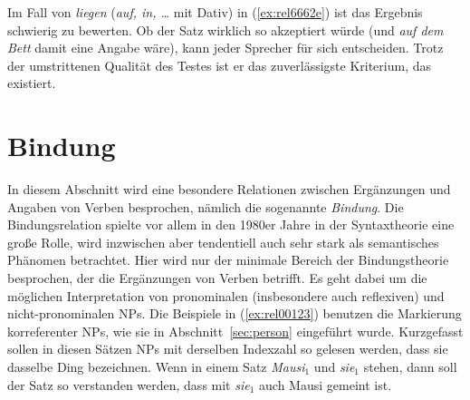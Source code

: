 \begin{exe}
  \ex\label{ex:rel6662}
  \begin{xlist}
  \end{xlist}
\end{exe}

Im Fall von \textit{liegen} (\textit{auf, in, \ldots} mit Dativ) in (\ref{ex:rel6662e}) ist das Ergebnis schwierig zu bewerten.
Ob der Satz wirklich so akzeptiert würde (und \textit{auf dem Bett} damit eine Angabe wäre), kann jeder Sprecher für sich entscheiden.
Trotz der umstrittenen Qualität des Testes ist er das zuverlässigste Kriterium, das existiert.

\Stretch[0.5]


\section{Bindung}

\label{sec:bindung}

In diesem Abschnitt wird eine besondere Relationen zwischen Ergänzungen und Angaben von Verben besprochen, nämlich die sogenannte \textit{Bindung}.
Die Bindungsrelation spielte vor allem in den 1980er Jahre in der Syntaxtheorie eine große Rolle, wird inzwischen aber tendentiell auch sehr stark als semantisches Phänomen betrachtet.
Hier wird nur der minimale Bereich der Bindungstheorie besprochen, der die Ergänzungen von Verben betrifft.
Es geht dabei um die möglichen Interpretation von pronominalen (insbesondere auch reflexiven) und nicht-pronominalen NPs.
Die Beispiele in (\ref{ex:rel00123}) benutzen die Markierung korreferenter NPs, wie sie in Abschnitt~\ref{sec:person} eingeführt wurde.
Kurzgefasst sollen in diesen Sätzen NPs mit derselben Indexzahl so gelesen werden, dass sie dasselbe Ding bezeichnen.
Wenn in einem Satz \textit{Mausi$_1$} und \textit{sie$_1$} stehen, dann soll der Satz so verstanden werden, dass mit \textit{sie$_1$} auch Mausi gemeint ist.

